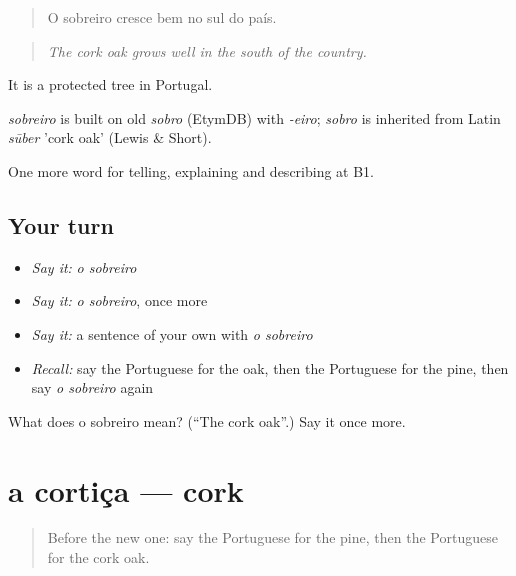 \begin{quote}
O sobreiro cresce bem no sul do país.
\end{quote}

\begin{quote}
\emph{The cork oak grows well in the south of the country.}
\end{quote}

It is a protected tree in Portugal.

\begin{cousinweb}
\emph{sobreiro} is built on old \emph{sobro} (EtymDB) with \emph{-eiro}; \emph{sobro} is inherited from Latin \emph{sūber} 'cork oak' (Lewis \& Short).
\end{cousinweb}

\begin{grammarlens}[title={What you've built}]
One more word for telling, explaining and describing at B1.
\end{grammarlens}

\subsection*{Your turn}
\begin{itemize}
\raggedright
  \item \emph{Say it:} \emph{o sobreiro}
  \item \emph{Say it:} \emph{o sobreiro}, once more
  \item \emph{Say it:} a sentence of your own with \emph{o sobreiro}
  \item \emph{Recall:} say the Portuguese for the oak, then the Portuguese for the pine, then say \emph{o sobreiro} again
\end{itemize}

\begin{tcolorbox}[breakable,colback=teal!4,colframe=teal!35!black,title={Before you move on}]
What does o sobreiro mean? (\textquotedblleft{}The cork oak\textquotedblright{}.) Say it once more.
\end{tcolorbox}
\section[a cortiça]{a cortiça — cork}

\label{lesson:PT-C457-cortica}



\begin{quote}
Before the new one: say the Portuguese for the pine, then the Portuguese for the cork oak.
\end{quote}

